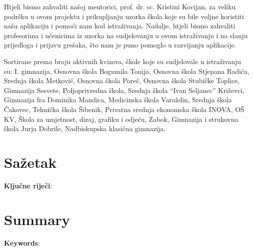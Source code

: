 \documentclass{scrreprt}
\begin{document}
Htjeli bismo zahvaliti našoj mentorici, prof. dr. sc. Kristini Kocijan, za
veliku podršku u ovom projektu i prikupljanju uzorka škola koje su bile voljne
koristiti našu aplikaciju i pomoći nam kod istraživanja. Nadalje, htjeli bismo
zahvaliti profesorima i učenicima iz uzorka na sudjelovanju u ovom istraživanju
i na slanju prijedloga i prijavu grešaka, što nam je puno pomoglo u razvijanju
aplikacije.

Sortirane prema broju aktivnih kvizova, škole koje su sudjelovale u istraživanju
su: I. gimnazija, Osnovna škola Bogumila Tonija, Osnovna škola Stjepana Radića,
Srednja škola Metković, Osnovna škola Poreč, Osnovna škola Stubičke Toplice,
Gimnazija Sesvete, Poljoprivredna škola, Srednja škola ``Ivan Seljanec''
Križevci, Gimnazija fra Dominika Mandica, Medicinska škola Varaždin, Srednja
škola Čakovec, Tehnička škola Šibenik, Privatna srednja ekonomska škola INOVA,
OŠ KV, Škola za umjetnost, dizaj, grafiku i odjeću, Zabok, Gimnazija i strukovna
škola Jurja Dobrile, Nadbiskupska klasična gimnazija.

\listoffigures

\renewcommand{\bibname}{Popis literature}

\begin{thebibliography}{9}
\end{thebibliography}

\chapter{Sažetak}

\textbf{Ključne riječi}:

\chapter{Summary}

\textbf{Keywords}:
\end{document}
